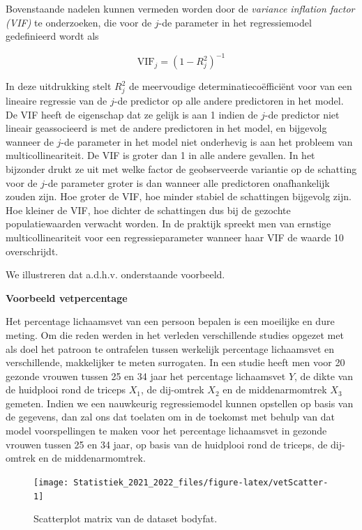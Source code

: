 \documentclass[
  12pt,dutch,coursenotes]{book}
\theoremstyle{definition}
\theoremstyle{definition}
\theoremstyle{definition}
\theoremstyle{definition}
\theoremstyle{remark}
\begin{document}
Bovenstaande nadelen kunnen vermeden worden door de \textit{variance inflation factor (VIF)} te onderzoeken, die voor de \(j\)-de parameter in het regressiemodel gedefinieerd wordt als

\[
\textrm{VIF}_j=\left(1-R_j^2\right)^{-1}
\]

In deze uitdrukking stelt \(R_j^2\) de meervoudige determinatiecoëfficiënt voor van een lineaire regressie van de \(j\)-de predictor op alle andere predictoren in het model. De VIF heeft de eigenschap dat ze gelijk is aan 1 indien de \(j\)-de predictor niet lineair geassocieerd is met de andere predictoren in het model, en bijgevolg wanneer de \(j\)-de parameter in het model niet onderhevig is aan het probleem van multicollineariteit. De VIF is groter dan 1 in alle andere gevallen. In het bijzonder drukt ze uit met welke factor de geobserveerde variantie op de schatting voor de \(j\)-de parameter groter is dan wanneer alle predictoren onafhankelijk zouden zijn. Hoe groter de VIF, hoe minder stabiel de schattingen bijgevolg zijn. Hoe kleiner de VIF, hoe dichter de schattingen dus bij de gezochte populatiewaarden verwacht worden. In de praktijk spreekt men van ernstige multicollineariteit voor een regressieparameter wanneer haar VIF de waarde 10 overschrijdt.

We illustreren dat a.d.h.v. onderstaande voorbeeld.

\textbf{Voorbeeld vetpercentage}

Het percentage lichaamsvet van een persoon bepalen is een moeilijke en dure meting.
Om die reden werden in het verleden verschillende studies opgezet met als doel het patroon te ontrafelen tussen werkelijk percentage lichaamsvet en verschillende, makkelijker te meten surrogaten.
In een studie heeft men voor
20 gezonde vrouwen tussen 25 en 34 jaar het percentage lichaamsvet \(Y\), de dikte van de huidplooi rond de triceps \(X_1\), de dij-omtrek \(X_2\) en de middenarmomtrek \(X_3\) gemeten.
Indien we een nauwkeurig regressiemodel kunnen opstellen op basis van de gegevens, dan zal ons dat toelaten om in de toekomst met behulp van dat model voorspellingen te maken voor het percentage lichaamsvet in gezonde vrouwen tussen 25 en 34 jaar, op basis van de huidplooi rond de triceps, de dij-omtrek en de middenarmomtrek.

\begin{figure}

{\centering \texttt{[image: Statistiek\_2021\_2022\_files/figure-latex/vetScatter-1]} 

}

\caption{Scatterplot matrix van de dataset bodyfat.}\label{fig:vetScatter}
\end{figure}
\end{document}
